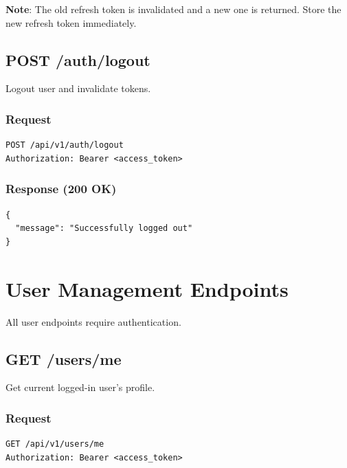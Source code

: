 \documentclass[12pt,a4paper,oneside]{article}
\begin{document}
\textbf{Note}: The old refresh token is invalidated and a new one is returned. Store the new refresh token immediately.

\subsection{POST /auth/logout}

Logout user and invalidate tokens.

\subsubsection{Request}

\begin{lstlisting}
POST /api/v1/auth/logout
Authorization: Bearer <access_token>
\end{lstlisting}

\subsubsection{Response (200 OK)}

\begin{lstlisting}
{
  "message": "Successfully logged out"
}
\end{lstlisting}

\newpage

\section{User Management Endpoints}

All user endpoints require authentication.

\subsection{GET /users/me}

Get current logged-in user's profile.

\subsubsection{Request}

\begin{lstlisting}
GET /api/v1/users/me
Authorization: Bearer <access_token>
\end{lstlisting}
\end{document}
